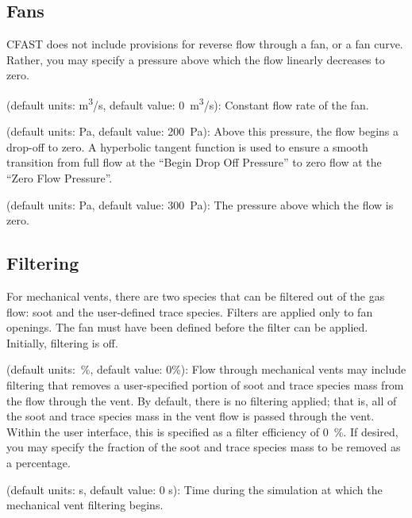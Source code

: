 {{\subsection{Fans}
\label{info:VENT4}
CFAST does not include provisions for reverse flow through a fan, or a fan curve. Rather, you may specify a pressure above which the flow linearly decreases to zero.
\begin{description}
\label{Mech Flow Rate}
\item[Flow Rate] (default units: \unit{m^3/s}, default value: 0~\unit{m^3/s}): Constant flow rate of the fan.
\label{Mech Begin Drop Off Pressure}
\item[Begin Drop Off Pressure] (default units: \unit{Pa}, default value: 200~\unit{Pa}): Above this pressure, the flow begins a drop-off to zero. A hyperbolic tangent function is used to ensure a smooth transition from full flow at the ``Begin Drop Off Pressure'' to zero flow at the ``Zero Flow Pressure''.
\label{Mech Zero Flow Pressure}
\item[Zero Flow Pressure] (default units: \unit{Pa}, default value: 300~\unit{Pa}): The pressure above which the flow is zero.
\end{description}




\subsection{Filtering}
\label{info:VENT5}
For mechanical vents, there are two species that can be filtered out of the gas flow: soot and the user-defined trace species. Filters are applied only to fan openings. The fan must have been defined before the filter can be applied. Initially, filtering is off.
\begin{description}
\label{Mech Filter Efficiency}
\item[Filter Efficiency] (default units:~\%, default value: 0\%): Flow through mechanical vents may include filtering that removes a user-specified portion of soot and trace species mass from the flow through the vent.  By default, there is no filtering applied; that is, all of the soot and trace species mass in the vent flow is passed through the vent. Within the user interface, this is specified as a filter efficiency of 0~\%.  If desired, you may specify the fraction of the soot and trace species mass to be removed as a percentage.
\label{Mech Begin Filtering At Time}
\item[Begin Filtering At Time] (default units: s, default value: 0 s): Time during the simulation at which the mechanical vent filtering begins.
\end{description}

}}
